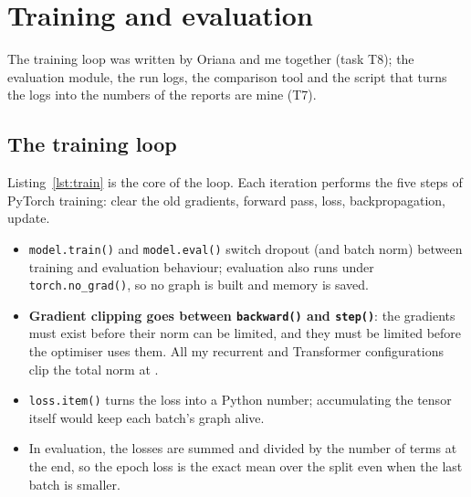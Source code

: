 \section{Training and evaluation}\label{sec:mllb-training}

The training loop was written by Oriana and me together (task T8); the evaluation module, the run logs,
the comparison tool and the script that turns the logs into the numbers of the reports are mine (T7).

\subsection{The training loop}

Listing~\ref{lst:train} is the core of the loop. Each iteration performs the five steps of PyTorch
training: clear the old gradients, forward pass, loss, backpropagation, update.
\begin{itemize}[leftmargin=1.2em,itemsep=1pt]
  \item \texttt{model.train()} and \texttt{model.eval()} switch dropout (and batch norm) between training
        and evaluation behaviour; evaluation also runs under \texttt{torch.no\_grad()}, so no graph is built
        and memory is saved.
  \item \textbf{Gradient clipping goes between \texttt{backward()} and \texttt{step()}}: the gradients must
        exist before their norm can be limited, and they must be limited before the optimiser uses them.
        All my recurrent and Transformer configurations clip the total norm at \rnnGradClip{}.
  \item \texttt{loss.item()} turns the loss into a Python number; accumulating the tensor itself would keep
        each batch's graph alive.
  \item In evaluation, the losses are summed and divided by the number of terms at the end, so the epoch
        loss is the exact mean over the split even when the last batch is smaller.
\end{itemize}



